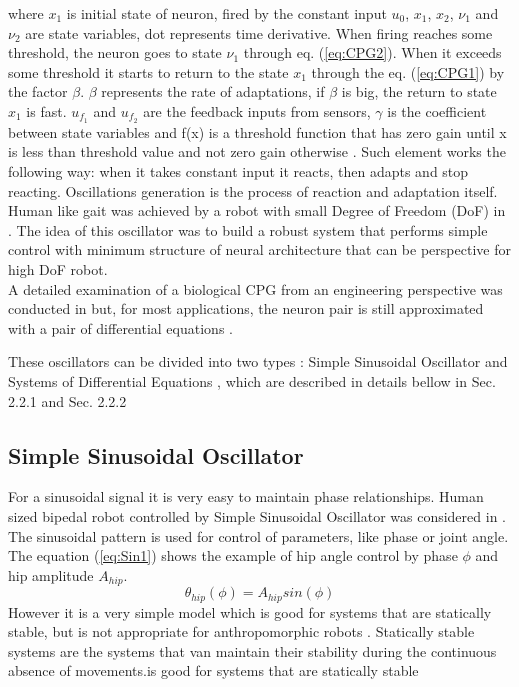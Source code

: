 \documentclass[12pt,a4paper]{report}
\begin{document}
		where $x_1$  is initial state of neuron, fired by the constant input $u_0$, $x_1$, $x_2$, $\nu_1$ and $\nu_2$ are state variables, dot represents time derivative.  When firing reaches some threshold, the neuron goes to state $\nu_1$ through eq. (\ref{eq:CPG2}). When it exceeds some threshold it starts to return to the state $x_1$ through the eq. (\ref{eq:CPG1}) by the factor $\beta$. $\beta$ represents the rate of adaptations, if $\beta$ is big, the return to state $x_1$ is fast. $u_{f_1}$ and $u_{f_2}$ are the feedback inputs from sensors, $\gamma$ is the coefficient between state variables and f(x) is a threshold function that has zero gain until x is less than threshold value and not zero gain otherwise . Such element works the following way: when it takes constant input it reacts, then adapts and stop reacting. Oscillations generation is the process of reaction and adaptation itself. \\
		
		Human like gait was achieved by a robot with small Degree of Freedom (DoF) in \cite{miyakoshi1998three}. The idea of this oscillator was to build a robust system that performs simple control with minimum structure of neural architecture that can be perspective for high DoF robot.\\
		
		A detailed examination of a biological CPG from an engineering perspective was conducted in \cite{zhu2006central} but, for most applications, the neuron pair is still approximated with a pair of differential equations \cite{wright2014intelligent}.

		These oscillators can be divided into two types : Simple Sinusoidal Oscillator and Systems of Differential Equations \cite{wright2014intelligent}, which are described in details bellow in Sec. 2.2.1 and Sec. 2.2.2

		\subsection{Simple Sinusoidal Oscillator}
			For a sinusoidal signal it is very easy to maintain phase relationships. Human sized bipedal robot controlled by Simple Sinusoidal Oscillator was considered in \cite{morimoto2008biologically}. The sinusoidal pattern is used for control of parameters, like phase or joint angle. The equation (\ref{eq:Sin1}) shows the example of hip angle control by phase $\phi$ and hip amplitude $A_{hip}$.
			\begin{equation}\label{eq:Sin1}
				\theta_{hip} (\phi) = A_{hip} sin(\phi) 
			\end{equation}
 			However it is a very simple model which is good for systems that are statically stable, but is not appropriate for anthropomorphic robots \cite{wright2014intelligent}. Statically stable systems are the systems that van maintain their stability during the continuous absence of movements.is good for systems that are statically stable
\end{document}
